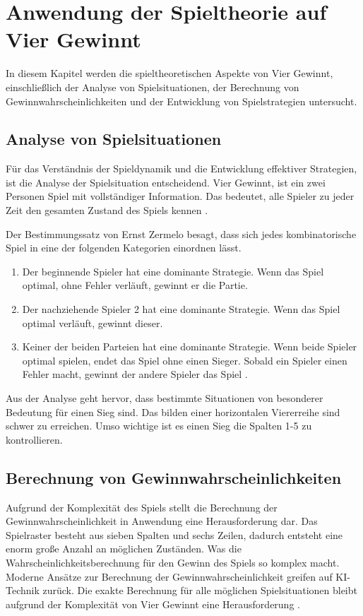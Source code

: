\chapter{Anwendung der Spieltheorie auf Vier Gewinnt}
\label{cha:nwendung der Spieltheorie auf Vier Gewinnt}
In diesem Kapitel werden die spieltheoretischen Aspekte von Vier Gewinnt, einschließlich der Analyse von Spielsituationen, der Berechnung von Gewinnwahrscheinlichkeiten und der Entwicklung von Spielstrategien untersucht.


\section{Analyse von Spielsituationen}
\label{sec:Analyse von Spielsituationen}
Für das Verständnis der Spieldynamik und die Entwicklung effektiver Strategien, ist die Analyse der Spielsituation entscheidend.
Vier Gewinnt, ist ein zwei Personen Spiel mit vollständiger Information. Das bedeutet, alle Spieler zu jeder Zeit den gesamten Zustand des Spiels kennen \autocite{ruile2009viergewinnt}.

Der Bestimmungssatz von Ernst Zermelo besagt, dass sich jedes kombinatorische Spiel in eine der folgenden Kategorien einordnen lässt.
\begin{enumerate}
	\item  Der beginnende Spieler hat eine dominante Strategie. Wenn das Spiel optimal, ohne Fehler verläuft, gewinnt er die Partie.
	\item Der nachziehende Spieler 2 hat eine dominante Strategie. Wenn das Spiel optimal verläuft, gewinnt dieser.
	\item Keiner der beiden Parteien hat eine dominante Strategie. Wenn beide Spieler optimal spielen, endet das Spiel ohne einen Sieger. Sobald ein Spieler einen Fehler macht, gewinnt der andere Spieler das Spiel \autocite{mueller_2011}.
\end{enumerate}

Aus der Analyse geht hervor, dass bestimmte Situationen von besonderer Bedeutung für einen Sieg sind.
Das bilden einer horizontalen Viererreihe sind schwer zu erreichen. Umso wichtige ist es einen Sieg die Spalten 1-5 zu kontrollieren. 


\section{Berechnung von Gewinnwahrscheinlichkeiten}
Aufgrund der Komplexität des Spiels stellt die Berechnung der Gewinnwahrscheinlichkeit in Anwendung eine Herausforderung dar. Das Spielraster besteht aus sieben Spalten und sechs Zeilen, dadurch entsteht eine enorm große Anzahl an möglichen Zuständen. Was die Wahrscheinlichkeitsberechnung für den Gewinn des Spiels so komplex macht.
Moderne Ansätze zur Berechnung der Gewinnwahrscheinlichkeit greifen auf KI-Technik zurück. Die exakte Berechnung für alle möglichen Spielsituationen bleibt aufgrund der Komplexität von Vier Gewinnt eine Herausforderung \autocite{ruile2009viergewinnt}.
